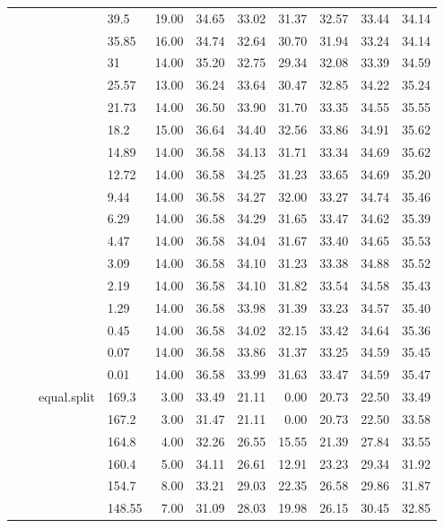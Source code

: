 \begin{longtable}{llllrrrrrrr}
   &  &  & 39.5 & 19.00 & 34.65 & 33.02 & 31.37 & 32.57 & 33.44 & 34.14 \\ 
   &  &  & 35.85 & 16.00 & 34.74 & 32.64 & 30.70 & 31.94 & 33.24 & 34.14 \\ 
   &  &  & 31 & 14.00 & 35.20 & 32.75 & 29.34 & 32.08 & 33.39 & 34.59 \\ 
   &  &  & 25.57 & 13.00 & 36.24 & 33.64 & 30.47 & 32.85 & 34.22 & 35.24 \\ 
   &  &  & 21.73 & 14.00 & 36.50 & 33.90 & 31.70 & 33.35 & 34.55 & 35.55 \\ 
   &  &  & 18.2 & 15.00 & 36.64 & 34.40 & 32.56 & 33.86 & 34.91 & 35.62 \\ 
   &  &  & 14.89 & 14.00 & 36.58 & 34.13 & 31.71 & 33.34 & 34.69 & 35.62 \\ 
   &  &  & 12.72 & 14.00 & 36.58 & 34.25 & 31.23 & 33.65 & 34.69 & 35.20 \\ 
   &  &  & 9.44 & 14.00 & 36.58 & 34.27 & 32.00 & 33.27 & 34.74 & 35.46 \\ 
   &  &  & 6.29 & 14.00 & 36.58 & 34.29 & 31.65 & 33.47 & 34.62 & 35.39 \\ 
   &  &  & 4.47 & 14.00 & 36.58 & 34.04 & 31.67 & 33.40 & 34.65 & 35.53 \\ 
   &  &  & 3.09 & 14.00 & 36.58 & 34.10 & 31.23 & 33.38 & 34.88 & 35.52 \\ 
   &  &  & 2.19 & 14.00 & 36.58 & 34.10 & 31.82 & 33.54 & 34.58 & 35.43 \\ 
   &  &  & 1.29 & 14.00 & 36.58 & 33.98 & 31.39 & 33.23 & 34.57 & 35.40 \\ 
   &  &  & 0.45 & 14.00 & 36.58 & 34.02 & 32.15 & 33.42 & 34.64 & 35.36 \\ 
   &  &  & 0.07 & 14.00 & 36.58 & 33.86 & 31.37 & 33.25 & 34.59 & 35.45 \\ 
   &  &  & 0.01 & 14.00 & 36.58 & 33.99 & 31.63 & 33.47 & 34.59 & 35.47 \\ 
   &  & equal.split & 169.3 & 3.00 & 33.49 & 21.11 & 0.00 & 20.73 & 22.50 & 33.49 \\ 
   &  &  & 167.2 & 3.00 & 31.47 & 21.11 & 0.00 & 20.73 & 22.50 & 33.58 \\ 
   &  &  & 164.8 & 4.00 & 32.26 & 26.55 & 15.55 & 21.39 & 27.84 & 33.55 \\ 
   &  &  & 160.4 & 5.00 & 34.11 & 26.61 & 12.91 & 23.23 & 29.34 & 31.92 \\ 
   &  &  & 154.7 & 8.00 & 33.21 & 29.03 & 22.35 & 26.58 & 29.86 & 31.87 \\ 
   &  &  & 148.55 & 7.00 & 31.09 & 28.03 & 19.98 & 26.15 & 30.45 & 32.85 \\ 

\end{longtable}
